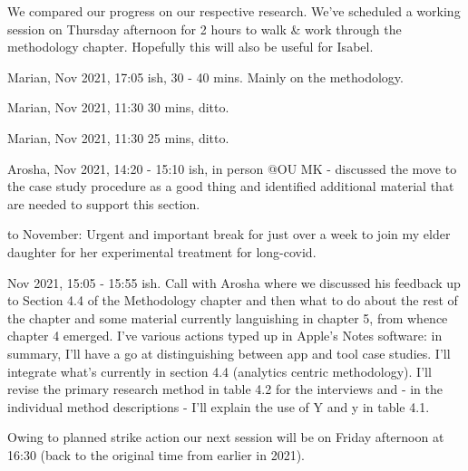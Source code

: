 We compared our progress on our respective research. We've scheduled a working session on Thursday afternoon for 2 hours to walk \& work through the methodology chapter. Hopefully this will also be useful for Isabel.

\dotfill

Marian,  Nov 2021, 17:05 ish, 30 - 40 mins. Mainly on the methodology.

\dotfill

Marian,  Nov 2021, 11:30 30 mins, ditto. 

\dotfill

Marian,  Nov 2021, 11:30 25 mins, ditto. 

\dotfill

Arosha,  Nov 2021, 14:20 - 15:10 ish, in person @OU MK - discussed the move to the case study procedure as a good thing and identified additional material that are needed to support this section. 

\dotfill

 to  November: Urgent and important break for just over a week to join my elder daughter for her experimental treatment for long-covid.

\dotfill

 Nov 2021, 15:05 - 15:55 ish. Call with Arosha where we discussed his feedback up to Section 4.4 of the Methodology chapter and then what to do about the rest of the chapter and some material currently languishing in chapter 5, from whence chapter 4 emerged. I've various actions typed up in Apple's Notes software: in summary, I'll have a go at distinguishing between app and tool case studies. I'll integrate what's currently in section 4.4 (analytics centric methodology). I'll revise the primary research method in table 4.2 for the interviews and - in the individual method descriptions - I'll explain the use of Y and y in table 4.1.

Owing to planned strike action our next session will be on Friday afternoon at 16:30 (back to the original time from earlier in 2021).

\clearpage


